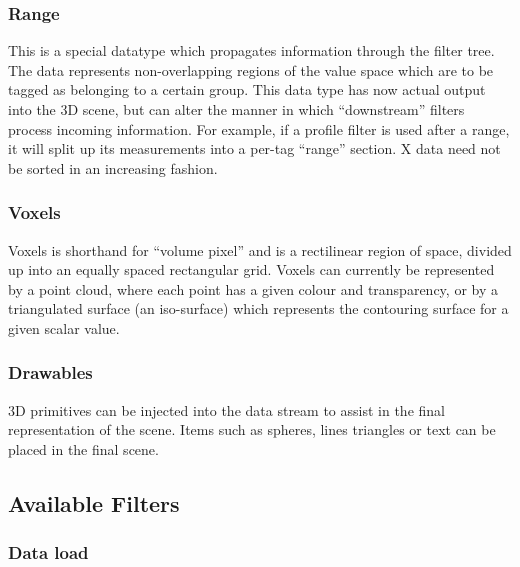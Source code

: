 \documentclass[10pt]{article}
\begin{document}
\subsubsection{Range}
This is a special datatype which propagates information through the filter tree. The data represents non-overlapping regions of the value space which are to be tagged as belonging to a certain group. This data type has now actual output into the 3D scene, but can alter the manner in which ``downstream'' filters process incoming information. For example, if a profile filter is used after a range, it will split up its measurements into a per-tag ``range'' section. X data need not be sorted in an increasing fashion.

\subsubsection{Voxels}
Voxels is shorthand for ``volume pixel'' and is a rectilinear region of space, divided up into an equally spaced rectangular grid. Voxels can currently be represented by a point cloud, where each point has a given colour and transparency, or by a triangulated surface (an iso-surface) which represents the contouring surface for a given scalar value.

\subsubsection{Drawables}
3D primitives can be injected into the data stream to assist in the final representation of the scene. Items such as spheres, lines triangles or text can be placed in the final scene.
 
\subsection{Available Filters}
\label{sec:filter} 
\subsubsection{Data load}
 
\end{document}
